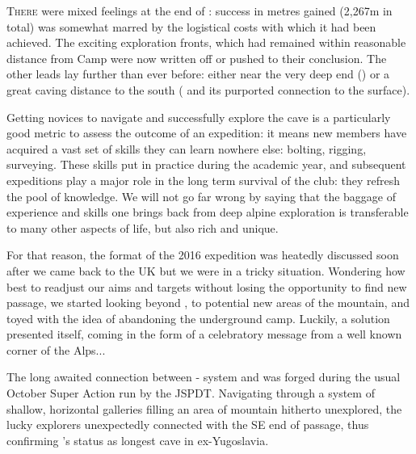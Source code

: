 \newpage
\thispagestyle{endchapter}

\begin{tcolorbox}
\vspace{80pt}
	\lettrine{T}{here} were mixed feelings at the end of : success in metres gained (2,267m in total) was somewhat marred by the logistical costs with which it had been achieved. The exciting exploration fronts, which had remained within reasonable distance from Camp were now written off or pushed to their conclusion. The other leads lay further than ever before: either near the very deep end () or a great caving distance to the south ( and its purported connection to the surface).

	Getting novices to navigate and successfully explore the cave is a particularly good metric to assess the outcome of an expedition: it means new members have acquired a vast set of skills they can learn nowhere else: bolting, rigging, surveying. These skills put in practice during the academic year, and subsequent expeditions play a major role in the long term survival of the club: they refresh the pool of knowledge. We will not go far wrong by saying that the baggage of experience and skills one brings back from deep alpine exploration is transferable to many other aspects of life, but also rich and unique.

	For that reason, the format of the 2016 expedition was heatedly discussed soon after we came back to the UK but we were in a tricky situation. Wondering how best to readjust our aims and targets without losing the opportunity to find new passage, we started looking beyond , to potential new areas of the mountain, and toyed with the idea of abandoning the underground camp. Luckily, a solution presented itself, coming in the form of a celebratory message from a well known corner of the Alps...

	The long awaited connection between  -  system and   was forged during the usual October Super Action run by the JSPDT. Navigating through a system of shallow, horizontal galleries filling an area of mountain hitherto unexplored, the lucky explorers unexpectedly connected with the SE end of  passage, thus confirming 's status as longest cave in ex-Yugoslavia.

	
\end{tcolorbox}
